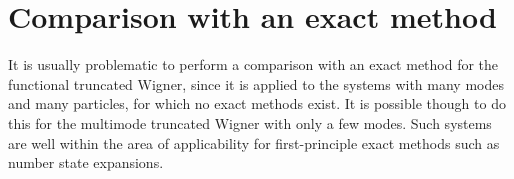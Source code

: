 \section{Comparison with an exact method}

It is usually problematic to perform a comparison with an exact method for the functional truncated Wigner, since it is applied to the systems with many modes and many particles, for which no exact methods exist.
It is possible though to do this for the multimode truncated Wigner with only a few modes.
Such systems are well within the area of applicability for first-principle exact methods such as number state expansions.

